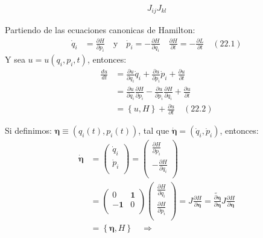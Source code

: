 \documentclass[a4paper]{article}
\begin{document}
\begin{answer}[punto 21]
        \begin{align*}
            J_{ij} J_{kl}
        \end{align*}

      
     


    \end{answer}
    
    \begin{answer}[Punto 22]
        Partiendo de las ecuaciones canonicas de Hamilton:
        \begin{align*}
            \dot q_i &= \frac{\partial H}{\partial p_i} \quad \text{y} \quad \dot p_i = -\frac{\partial H}{\partial q_i} \quad  \frac{\partial H }{\partial t} = -\frac{\partial L}{\partial t} \quad (22.1)
        \end{align*}
        Y sea $u = u(q_i, p_i, t)$, entonces:
        \begin{align*}
            \frac{du}{dt} &= \frac{\partial u}{\partial q_i} \dot q_i + \frac{\partial u}{\partial p_i} \dot p_i + \frac{\partial u}{\partial t}\\
            &= \frac{\partial u}{\partial q_i} \frac{\partial H}{\partial p_i} - \frac{\partial u}{\partial p_i} \frac{\partial H}{\partial q_i} + \frac{\partial u}{\partial t}\\
            &= \left\{u, H\right\} + \frac{\partial u}{\partial t} \quad (22.2)
        \end{align*}

        Si definimos: $\pmb \eta \equiv (q_i(t), p_i(t))$, tal que $\dot {\pmb \eta} = (\dot q_i, \dot p_i)$, entonces:
        \begin{align*}
            \dot {\pmb \eta} &= \begin{pmatrix}
                \dot q_i \\
                \dot p_i \\
            \end{pmatrix} = \begin{pmatrix}
                \frac{\partial H}{\partial p_i} \\
                -\frac{\partial H}{\partial q_i} \\
            \end{pmatrix}\\
             &= \begin{pmatrix}
                0 & \mathbf 1\\
                -\mathbf 1 & 0\\
            \end{pmatrix} \begin{pmatrix}
                \frac{\partial H}{\partial q_i} \\
                \frac{\partial H}{\partial p_i} \\
            \end{pmatrix} 
            = J \frac{\partial H}{\partial \pmb \eta} = \tilde{\frac{\partial \pmb \eta}{\partial \pmb \eta}} J \frac{\partial H}{\partial \pmb \eta} \\
            &= \left\{\pmb \eta, H\right\} \quad  \Rightarrow 
        \end{align*}


\end{answer}
\end{document}

